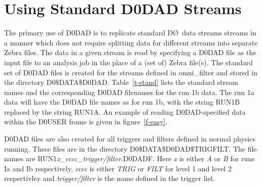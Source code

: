 \newpage

\section{Using Standard D0DAD Streams \label{ss-ug-standard}}
\par
The primary use of D0DAD is to replicate standard D\O\ data streams streams
in a manner which does not require splitting data for different streams
into separate Zebra files.  The data in a given stream is read by 
specifying a D0DAD file as the input file to an analysis job in the 
place of a (set of) Zebra file(s).  The standard set of D0DAD files is created 
for the streams defined in omni\_filter and stored in the directory 
D0\$DATA\$D0DAD.  Table~\ref{t-stand} lists the standard stream names and the 
corresponding D0DAD filenames for the run 1b data.  The run 1a data will have
the D0DAD file names as for run 1b, with the string RUN1B replaced by the
string RUN1A.   An example of reading 
D0DAD-specified data within the D0USER frame is given in figure~\ref{f-easy}.

\par
D0DAD files are also created for all triggers and filters defined in normal
physics running.  These files are in the directory D0\$DATA\$D0DAD\$TRIGFILT.
The file names are RUN1{\it x}\_{\it cccc}\_{\it trigger/filter}.D0DADF.  
Here {\it x} is either {\it A} or {\it B} 
for runs Ia and Ib respectively, {\it cccc} is either {\it TRIG} or 
{\it FILT} for level 1 and level 2 respectivley  and {\it trigger/filter}
is the name defined in the trigger list.

